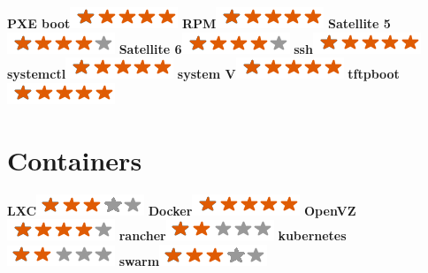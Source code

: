 \documentclass[]{friggeri-cv}
\begin{document}
\begin{aside}
        \textbf{PXE boot}\includegraphics[scale=0.40]{img/5stars.png}
        \textbf{RPM}\includegraphics[scale=0.40]{img/5stars.png}
        \textbf{Satellite 5}\includegraphics[scale=0.40]{img/4stars.png}
        \textbf{Satellite 6}\includegraphics[scale=0.40]{img/4stars.png}
        \textbf{ssh}\includegraphics[scale=0.40]{img/5stars.png}
        \textbf{systemctl}\includegraphics[scale=0.40]{img/5stars.png}
        \textbf{system V}\includegraphics[scale=0.40]{img/5stars.png}
        \textbf{tftpboot}\includegraphics[scale=0.40]{img/5stars.png}
	~
    \section{Containers}
        \textbf{LXC}\includegraphics[scale=0.40]{img/3stars.png}
        \textbf{Docker}\includegraphics[scale=0.40]{img/5stars.png}
        \textbf{OpenVZ}\includegraphics[scale=0.40]{img/4stars.png}
        \textbf{rancher}\includegraphics[scale=0.40]{img/2stars.png}
        \textbf{kubernetes}\includegraphics[scale=0.40]{img/2stars.png}
        \textbf{swarm}\includegraphics[scale=0.40]{img/3stars.png}
	~

\end{aside}
\end{document}
